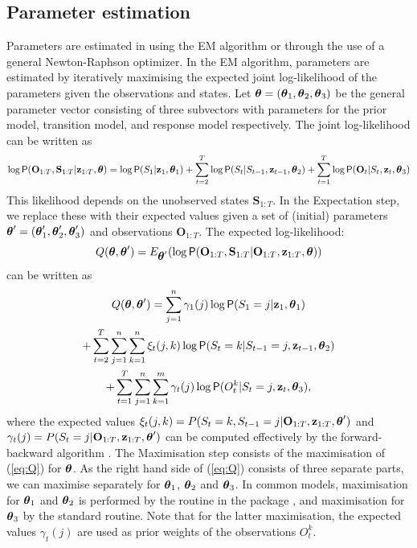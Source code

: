 \documentclass[article]{jss}
\newcommand{\vc}{\mathbf}
\newcommand{\greekv}[1]{\mbox{\boldmath$\mathrm{#1}$}}
\begin{document}
\subsection{Parameter estimation}

Parameters are estimated in  using the EM algorithm or
through the use of a general Newton-Raphson optimizer.  In the EM
algorithm, parameters are estimated by iteratively maximising the
expected joint log-likelihood of the parameters given the observations and
states.  Let $\greekv{\theta} = (\greekv{\theta}_1,
\greekv{\theta}_2,\greekv{\theta}_3)$ be the general parameter vector
consisting of three subvectors with parameters for the prior model,
transition model, and response model respectively.  The joint
log-likelihood can be written as
\begin{equation}
\log \Prob(\vc{O}_{1:T}, \vc{S}_{1:T}|\vc{z}_{1:T},\greekv{\theta}) = \log 
\Prob(S_1|\vc{z}_{1},\greekv{\theta}_1) 
+ \sum_{t=2}^{T} \log \Prob(S_t|S_{t-1},\vc{z}_{t-1},\greekv{\theta}_2) 
+ \sum_{t=1}^{T} \log \Prob(\vc{O}_t|S_t,\vc{z}_t,\greekv{\theta}_3)
\end{equation}
This likelihood depends on the unobserved states $\vc{S}_{1:T}$. In the 
Expectation step, we replace these with their expected values given a set of 
(initial) parameters $\greekv{\theta}' = (\greekv{\theta}'_1, 
\greekv{\theta}'_2,\greekv{\theta}'_3)$ and observations $\vc{O}_{1:T}$. 
The expected log-likelihood:
\begin{equation}
Q(\greekv{\theta},\greekv{\theta}') = E_{\greekv{\theta}'} 
(\log \Prob(\vc{O}_{1:T},\vc{S}_{1:T}|\vc{O}_{1:T},\vc{z}_{1:T},\greekv{\theta}))
\end{equation}
can be written as
\begin{multline}
\label{eq:Q}
Q(\greekv{\theta},\greekv{\theta}') = 
\sum_{j=1}^n \gamma_1(j) \log \Prob(S_1=j|\vc{z}_1,\greekv{\theta}_1) \\ 
+ \sum_{t=2}^T \sum_{j=1}^n \sum_{k=1}^n \xi_t(j,k) \log \Prob(S_t = k|S_{t-1} 
= j,\vc{z}_{t-1},\greekv{\theta}_2)  \\
 + \sum_{t=1}^T \sum_{j=1}^n \sum_{k=1}^m \gamma_t(j) 
\log \Prob(O^k_t|S_t=j,\vc{z}_t,\greekv{\theta}_3),
\end{multline}
where the expected values $\xi_t(j,k) = P(S_t = k, S_{t-1} =
j|\vc{O}_{1:T}, \vc{z}_{1:T},\greekv{\theta}')$ and $\gamma_t(j) =
P(S_t = j|\vc{O}_{1:T}, \vc{z}_{1:T},\greekv{\theta}')$ can be
computed effectively by the forward-backward algorithm \citep[see
e.g.,][]{Rabiner1989}.  The Maximisation step consists of the
maximisation of (\ref{eq:Q}) for $\greekv{\theta}$.  As the right hand
side of (\ref{eq:Q}) consists of three separate parts, we can maximise
separately for $\greekv{\theta}_1$, $\greekv{\theta}_2$ and
$\greekv{\theta}_3$.  In common models, maximisation for
$\greekv{\theta}_1$ and $\greekv{\theta}_2$ is performed by the
 routine in the  package
\citep{Venables2002}, and maximisation for $\greekv{\theta}_3$ by the
standard  routine.  Note that for the latter maximisation,
the expected values $\gamma_t(j)$ are used as prior weights of the
observations $O^k_t$.
\end{document}
